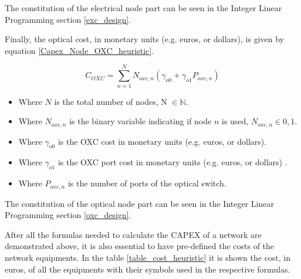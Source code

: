 The constitution of the electrical node part can be seen in the Integer Linear Programming section \ref{exc_design}.

Finally, the optical cost, in monetary units (e.g. euros, or dollars), is given by equation \ref{Capex_Node_OXC_heuristic}.

\begin{equation}
C_{OXC} = \sum_{n=1}^{N} N_{oxc,n} \left( \gamma_{o0} + \gamma_{o1} P_{oxc,n} \right)
\label{Capex_Node_OXC_heuristic}
\end{equation}

\begin{itemize}
\item Where {$N$ is the total number of nodes, N $\in \mathbb{N}$}.
\item Where {$N_{oxc,n}$ is the binary variable indicating if node $n$ is used, $N_{oxc,n} \in {0, 1}$}.
\item Where {$\gamma_{o0}$ is the OXC cost in monetary units (e.g. euros, or dollars)}.
\item Where {$\gamma_{o1}$ is the OXC port cost in monetary units (e.g. euros, or dollars) }.
\item Where {$P_{oxc,n}$ is the number of ports of the optical switch}.
\end{itemize}

The constitution of the optical node part can be seen in the Integer Linear Programming section \ref{oxc_design}.

After all the formulas needed to calculate the CAPEX of a network are demonstrated above, it is also essential to have pre-defined the costs of the network equipments. In the table \ref{table_cost_heuristic} it is shown the cost, in euros, of all the equipments with their symbols used in the respective formulas.\\

